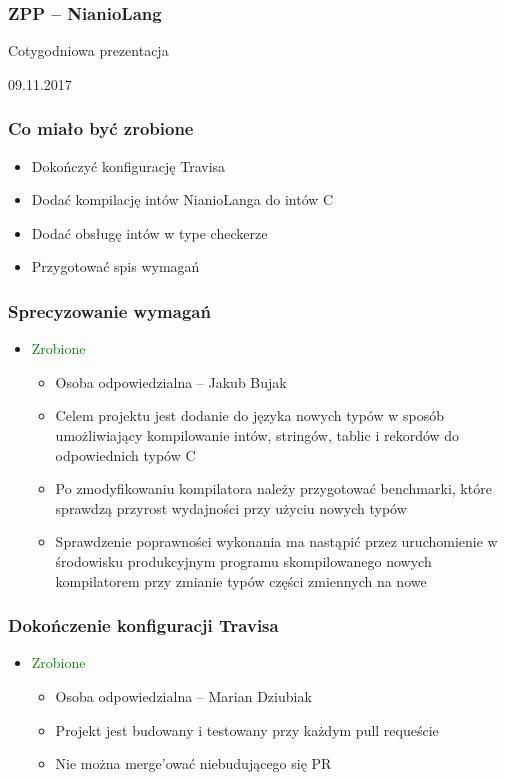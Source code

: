 \documentclass{beamer}
\begin{document}
	\begin{frame}
		\frametitle{ZPP -- NianioLang}
		Cotygodniowa prezentacja
		
		09.11.2017
	\end{frame}
	
	\begin{frame}
		\frametitle{Co miało być zrobione}
		\begin{itemize}
		 \item Dokończyć konfigurację Travisa
		 \item Dodać kompilację intów NianioLanga do intów C
		 \item Dodać obsługę intów w type checkerze
		 \item Przygotować spis wymagań
		\end{itemize}
	\end{frame}
	
	\begin{frame}
		\frametitle{Sprecyzowanie wymagań}
		\begin{itemize}
			\item\textcolor{green}{Zrobione}
			\begin{itemize}
				\item Osoba odpowiedzialna -- Jakub Bujak
				\item Celem projektu jest dodanie do języka nowych typów w sposób umożliwiający kompilowanie
				intów, stringów, tablic i rekordów do odpowiednich typów C
				\item Po zmodyfikowaniu kompilatora należy przygotować benchmarki, które sprawdzą przyrost wydajności
				przy użyciu nowych typów
				\item Sprawdzenie poprawności wykonania ma nastąpić przez uruchomienie w środowisku produkcyjnym
				programu skompilowanego nowych kompilatorem przy zmianie typów części zmiennych na nowe
			\end{itemize}
		\end{itemize}
	\end{frame}
	
	\begin{frame}
		\frametitle{Dokończenie konfiguracji Travisa}
		\begin{itemize}
			\item\textcolor{green}{Zrobione}
			\begin{itemize}
				\item Osoba odpowiedzialna -- Marian Dziubiak
				\item Projekt jest budowany i testowany przy każdym pull requeście
				\item Nie można merge'ować niebudującego się PR
			\end{itemize}
		\end{itemize}
	\end{frame}
	
\end{document}

